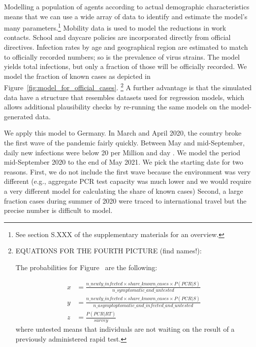 Modelling a population of agents according to actual demographic characteristics means
that we can use a wide array of data to identify and estimate the model's many
parameters.\footnote{See section S.XXX of the supplementary materials for an
    overview.} Mobility data is used to
model the reductions in work contacts. School and daycare policies are incorporated
directly from official directives. Infection rates by age and geographical region are
estimated to match to officially recorded numbers; so is the prevalence of virus
strains. The model yields total infections, but only a fraction of those will be
officially recorded. We model the fraction of known cases as depicted in
Figure~\ref{fig:model_for_official_cases}.
\footnote{EQUATIONS FOR THE FOURTH PICTURE (find names!):

    The probabilities for Figure~ are the
    following:

    \begin{align*}
        x & = \frac{n\_newly\_infected \times share\_known\_cases \times P(PCR | S)}{n\_symptomatic\_and\_untested}                    \\
        y & = \frac{n\_newly\_infected \times share\_known\_cases \times P(PCR | S)}{n\_asymptoptomatic\_and\_infected\_and\_untested} \\
        z & = \frac{P(PCR | RT)}{survey}
    \end{align*}
    where untested means that individuals are not waiting on the result of a previously
    administered rapid test.} A further advantage is that the simulated data have a
structure that resembles datasets used for regression models, which allows
additional plausibility checks by re-running the same models on the model-generated
data.

We apply this model to Germany. In March and April 2020, the country broke the first
wave of the pandemic fairly quickly. Between May and mid-September, daily new infections
were below 20 per Million and day \citep{owidcoronavirus}. We model the period
mid-September 2020 to the end of May 2021. We pick the starting date for two reasons.
First, we do not include the first wave because the environment was very different
(e.g., aggregate PCR test capacity was much lower and we would require a very different
model for calculating the share of known cases) Second, a large fraction cases during
summer of 2020 were traced to international travel \citep{KochInstitut2021,Hodcroft2021}
but the precise number is difficult to model.

